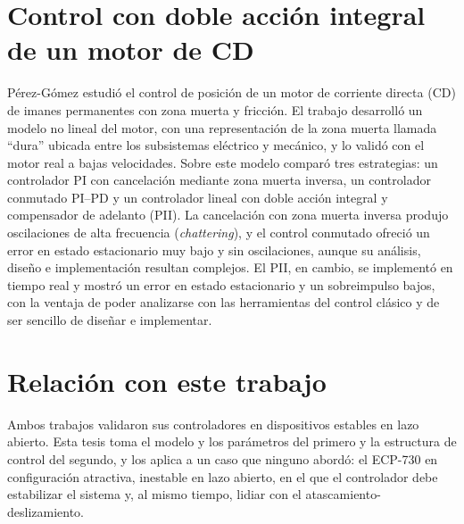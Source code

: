 \section{Control con doble acción integral de un motor de CD}

Pérez-Gómez \cite{perez} estudió el control de posición de un motor de corriente directa (CD) de imanes permanentes con zona muerta y fricción. El trabajo desarrolló un modelo no lineal del motor, con una representación de la zona muerta llamada ``dura'' ubicada entre los subsistemas eléctrico y mecánico, y lo validó con el motor real a bajas velocidades. Sobre este modelo comparó tres estrategias: un controlador PI con cancelación mediante zona muerta inversa, un controlador conmutado PI--PD y un controlador lineal con doble acción integral y compensador de adelanto (PII). La cancelación con zona muerta inversa produjo oscilaciones de alta frecuencia (\emph{chattering}), y el control conmutado ofreció un error en estado estacionario muy bajo y sin oscilaciones, aunque su análisis, diseño e implementación resultan complejos. El PII, en cambio, se implementó en tiempo real y mostró un error en estado estacionario y un sobreimpulso bajos, con la ventaja de poder analizarse con las herramientas del control clásico y de ser sencillo de diseñar e implementar.

\section{Relación con este trabajo}

Ambos trabajos validaron sus controladores en dispositivos estables en lazo abierto. Esta tesis toma el modelo y los parámetros del primero y la estructura de control del segundo, y los aplica a un caso que ninguno abordó: el ECP-730 en configuración atractiva, inestable en lazo abierto, en el que el controlador debe estabilizar el sistema y, al mismo tiempo, lidiar con el atascamiento-deslizamiento.
